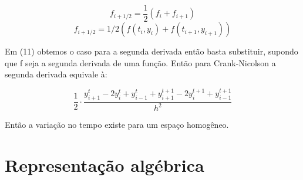 \documentclass[linenumbers]{aastex631}
\begin{document}
$$f_{i+1/2}=\frac{1}{2}(f_i+f_{i+1})$$
$$f_{i+1/2}=1/2(f(t_i,y_i)+f(t_{i+1},y_{i+1}))$$

Em (11) obtemos o caso para a segunda derivada então basta substituir, supondo que f seja a segunda derivada de uma função. Então para Crank-Nicolson a segunda derivada equivale à:

\begin{equation}
    \frac{1}{2}\cdot\frac{y^t_{i+1}-2y^t_i+y^t_{i-1}+y^{t+1}_{i+1}-2y^{t+1}_i+y^{t+1}_{i-1}}{h^2}
\end{equation}

Então a variação no tempo existe para um espaço homogêneo.

\section{Representação algébrica}
\end{document}
